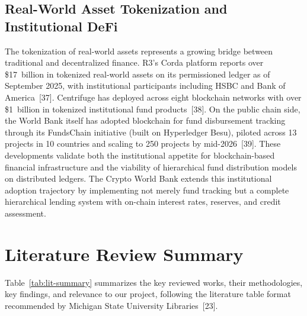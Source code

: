 \documentclass[12pt,a4paper]{report}
\begin{document}
\subsection{Real-World Asset Tokenization and Institutional DeFi}

The tokenization of real-world assets represents a growing bridge between traditional and decentralized finance. R3's Corda platform reports over \$17~billion in tokenized real-world assets on its permissioned ledger as of September 2025, with institutional participants including HSBC and Bank of America~[37]. Centrifuge has deployed across eight blockchain networks with over \$1~billion in tokenized institutional fund products~[38]. On the public chain side, the World Bank itself has adopted blockchain for fund disbursement tracking through its FundsChain initiative (built on Hyperledger Besu), piloted across 13 projects in 10 countries and scaling to 250 projects by mid-2026~[39]. These developments validate both the institutional appetite for blockchain-based financial infrastructure and the viability of hierarchical fund distribution models on distributed ledgers. The Crypto World Bank extends this institutional adoption trajectory by implementing not merely fund tracking but a complete hierarchical lending system with on-chain interest rates, reserves, and credit assessment.


\section{Literature Review Summary}

Table~\ref{tab:lit-summary} summarizes the key reviewed works, their methodologies, key findings, and relevance to our project, following the literature table format recommended by Michigan State University Libraries~[23].
\end{document}
